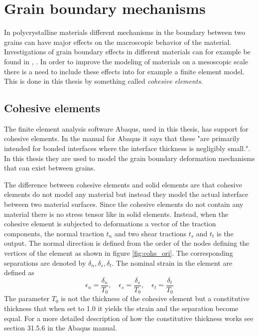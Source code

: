 \documentclass[grain_boundary_law.tex]{subfiles}
\begin{document}
\FloatBarrier

\chapter{Grain boundary mechanisms}


In polycrystalline materials different mechanisms in the boundary between two grains can have major effects on the macroscopic behavior of the material. Investigations of grain boundary effects in different materials can for example be found in \cite{eff_grain}, \cite{grain_poly}. In order to improve the modeling of materials on a mesoscopic scale there is a need to include these effects into for example a finite element model. This is done in this thesis by something called \textit{cohesive elements}.

\section{Cohesive elements}

The finite element analysis software Abaqus, used in this thesis, has support for cohesive elements. In the manual for Abaqus it says that these "are primarily intended for bonded interfaces where the interface thickness is negligibly small.". In this thesis they are used to model the grain boundary deformation mechanisms that can exist between grains.

The difference between cohesive elements and solid elements are that cohesive elements do not model any material but instead they model the actual interface between two material surfaces. Since the cohesive elements do not contain any material there is no stress tensor like in solid elements. Instead, when the cohesive element is subjected to deformations a vector of the traction components, the normal traction $t_n$ and two shear tractions $t_s$ and $t_t$ is the output. The normal direction is defined from the order of the nodes defining the vertices of the element as shown in figure \ref{fig:cohs_ori}. The corresponding separations are denoted by $\delta_n, \delta_s, \delta_t$. The nominal strain in the element are defined as
%
\[ \epsilon_n = \frac{\delta_n}{T_0}, \quad \epsilon_s = \frac{\delta_s}{T_0}, \quad \epsilon_t = \frac{\delta_t}{T_0}  \]
%
The parameter $T_0$ is not the thickness of the cohesive element but a constitutive thickness that when set to 1.0 it yields the strain and the separation become equal. For a more detailed description of how the constitutive thickness works see section 31.5.6 in the Abaqus manual.
\end{document}
